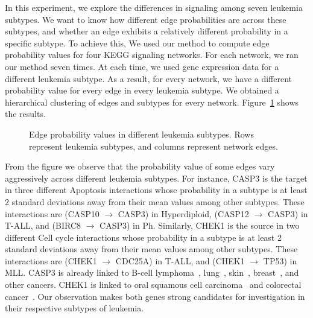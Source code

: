 \documentclass[runningheads,a4paper]{llncs}
\newcommand{\goodgap}{
        \hspace{\subfigtopskip}
        \hspace{\subfigbottomskip}}
\begin{document}
In this experiment, we explore the differences in signaling among seven leukemia
subtypes. We want to know how different edge probabilities are across these
subtypes, and whether an edge exhibits a relatively different probability in a
specific subtype. To achieve this, We used our method to compute edge
probability values for four KEGG signaling networks. For each network, we ran
our method seven times. At each time, we used gene expression data for a
different leukemia subtype. As a result, for every network, we have a different
probability value for every edge in every leukemia subtype. We obtained a
hierarchical clustering of edges and subtypes for every network.
Figure~\ref{fig:prob_cluster} shows the results.

\begin{figure}[t]
\centering
{}
\goodgap
{}
\goodgap
{}
\goodgap
{}
\caption{Edge probability values in different leukemia subtypes. Rows represent
leukemia subtypes, and columns represent network edges.}
\label{fig:prob_cluster}
\end{figure}

From the figure we observe that the probability value of some edges vary
aggressively across different leukemia subtypes. For instance, CASP3 is the
target in three different Apoptosis interactions whose probability in a
subtype is at least 2 standard deviations away from their mean values among
other subtypes. These interactions are (CASP10 $\rightarrow$ CASP3) in
Hyperdiploid, (CASP12 $\rightarrow$ CASP3) in T-ALL, and (BIRC8 $\rightarrow$
CASP3) in Ph. Similarly, CHEK1 is the source in two different Cell cycle
interactions whose probability in a subtype is at least 2 standard deviations
away from their mean values among other subtypes. These interactions are (CHEK1
$\rightarrow$ CDC25A) in T-ALL, and (CHEK1 $\rightarrow$ TP53) in MLL. CASP3
is already linked to B-cell lymphoma~\cite{casp3_lymphoma},
lung~\cite{casp3_lung}, skin~\cite{casp3_skin}, breast~\cite{casp3_breast}, and
other cancers. CHEK1 is linked to oral squamous cell
carcinoma~\cite{chek1_oral} and colorectal cancer~\cite{chek1_colorectal}. Our
observation makes both genes strong candidates for investigation in their
respective subtypes of leukemia.
\end{document}

